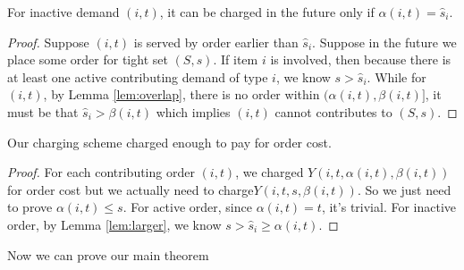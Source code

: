 \begin{lemma}
For inactive demand $(i,t)$, it can be charged in the future only if $\alpha(i,t) = \hat s_i$. \label{lem:charge}
\end{lemma}
\begin{proof}
Suppose $(i,t)$ is served by order earlier than $\hat s_i$. Suppose in the future we place some order for tight set $(S,s)$. If item $i$ is involved, then because there is at least one active contributing demand of type $i$, we know $s > \hat s_i$. While for $(i,t)$, by Lemma \ref{lem:overlap}, there is no order within $(\alpha(i,t), \beta(i,t)]$, it must be that $\hat s_i > \beta(i,t)$ which implies $(i,t)$ cannot contributes to $(S,s)$.
\end{proof}

\begin{lemma}
Our charging scheme charged enough to pay for order cost.
\end{lemma}
\begin{proof}
For each contributing order $(i,t)$, we charged $Y(i,t,\alpha(i,t),\beta(i,t))$ for order cost but we actually need to charge$Y(i,t,s,\beta(i,t))$. So we just need to prove $\alpha(i,t) \le s$. For active order, since $\alpha(i,t) = t$, it's trivial. For inactive order, by Lemma \ref{lem:larger}, we know $s > \hat s_i \ge \alpha(i,t)$.
\end{proof}

Now we can prove our main theorem

